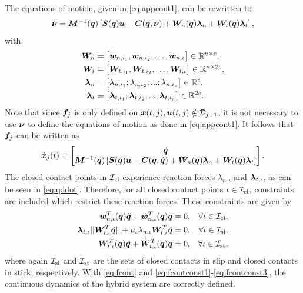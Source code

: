 \documentclass[../DC2019003Bouma.tex]{subfiles}
\begin{document}
The equations of motion, given in \eqref{eq:appcont1}, can be rewritten to
\begin{align}
\dot{\boldsymbol{\nu}} = {\boldsymbol{M}}^{-1}({\boldsymbol{q}})\left[ {\boldsymbol{S}}({\boldsymbol{q}}){\boldsymbol{u}} - {\boldsymbol{C}}({\boldsymbol{q}},\boldsymbol{\nu}) + {\boldsymbol{W}}_{n}({\boldsymbol{q}})\boldsymbol{\lambda}_{n} + {\boldsymbol{W}}_{t}({\boldsymbol{q}})\boldsymbol{\lambda}_{t}\right],\label{eq:qddot}
\end{align}
with
\begin{align*}
{\boldsymbol{W}}_n &= \begin{bmatrix}
{\boldsymbol{w}}_{n,i_1},{\boldsymbol{w}}_{n,i_2},\dots,{\boldsymbol{w}}_{n,\iota}
\end{bmatrix}\in\mathbb{R}^{n\times c},\\
{\boldsymbol{W}}_t &= \begin{bmatrix}
{\boldsymbol{W}}_{t,i_1},{\boldsymbol{W}}_{t,i_2},\dots,{\boldsymbol{W}}_{t,\iota} 
\end{bmatrix}\in\mathbb{R}^{n\times 2c},\\
\boldsymbol{\lambda}_n &= \begin{bmatrix}
\lambda_{n,\iota_1};\lambda_{n,\iota_2};...;\lambda_{n,\iota_c} 
\end{bmatrix}\in\mathbb{R}^{c},\\
\boldsymbol{\lambda}_t &= \begin{bmatrix}
\boldsymbol{\lambda}_{t,\iota_1};\boldsymbol{\lambda}_{t,\iota_2};...;\boldsymbol{\lambda}_{t,\iota_c} 
\end{bmatrix}\in\mathbb{R}^{2c}.
\end{align*}
Note that since ${\boldsymbol{f}}_j$ is only defined on ${\boldsymbol{x}}(t,j),{\boldsymbol{u}}(t,j)\notin \mathcal{D}_{j+1}$, it is not necessary to use $\boldsymbol{\nu}$ to define the equations of motion as done in \eqref{eq:appcont1}. It follows that ${\boldsymbol{f}}_j$ can be written as
\begin{align}
\dot{{\boldsymbol{x}}}_j(t) =\begin{bmatrix}
\dot{{\boldsymbol{q}}}\\ {\boldsymbol{M}}^{-1}({\boldsymbol{q}})\left[ {\boldsymbol{S}}({\boldsymbol{q}}){\boldsymbol{u}} - {\boldsymbol{C}}({\boldsymbol{q}},\dot{{\boldsymbol{q}}}) + {\boldsymbol{W}}_{n}({\boldsymbol{q}})\boldsymbol{\lambda}_{n} + {\boldsymbol{W}}_{t}({\boldsymbol{q}})\boldsymbol{\lambda}_{t}\right]
\end{bmatrix}.\label{eq:fcont}
\end{align}
The closed contact points in $\mathcal{I}_{\text{cl}}$ experience reaction forces $\lambda_{n,\iota}$ and $\boldsymbol{\lambda}_{t,\iota}$, as can be seen in \eqref{eq:qddot}. Therefore, for all closed contact points $\iota\in\mathcal{I}_{\text{cl}}$, constraints are included which restrict these reaction forces. These constraints are given by
\begin{align}
{\boldsymbol{w}}^T_{n,\iota}({\boldsymbol{q}})\ddot{{\boldsymbol{q}}} + \dot{{\boldsymbol{w}}}^T_{n,\iota}({\boldsymbol{q}})\dot{{\boldsymbol{q}}} &= 0, &\forall \iota\in\mathcal{I}_{\text{cl}},\label{eq:fcontconst1}\\
\boldsymbol{\lambda}_{t,\iota}||{\boldsymbol{W}}_{t,\iota}^T\dot{{\boldsymbol{q}}}|| + \mu_{\iota}\lambda_{n,\iota}{\boldsymbol{W}}_{t,\iota}^T\dot{{\boldsymbol{q}}} &= 0, &\forall \iota\in\mathcal{I}_{\text{sl}},\label{eq:fcontconst2}\\
{\boldsymbol{W}}^T_{t,\iota}({\boldsymbol{q}})\ddot{{\boldsymbol{q}}} + \dot{{\boldsymbol{W}}}^T_{t,\iota}({\boldsymbol{q}})\dot{{\boldsymbol{q}}} &= 0, &\forall \iota\in\mathcal{I}_{\text{st}},\label{eq:fcontconst3}
\end{align}
where again $\mathcal{I}_{\text{sl}}$ and $\mathcal{I}_{\text{st}}$ are the sets of closed contacts in slip and closed contacts in stick, respectively. With \eqref{eq:fcont} and \eqref{eq:fcontconst1}-\eqref{eq:fcontconst3}, the continuous dynamics of the hybrid system are correctly defined.
\end{document}
